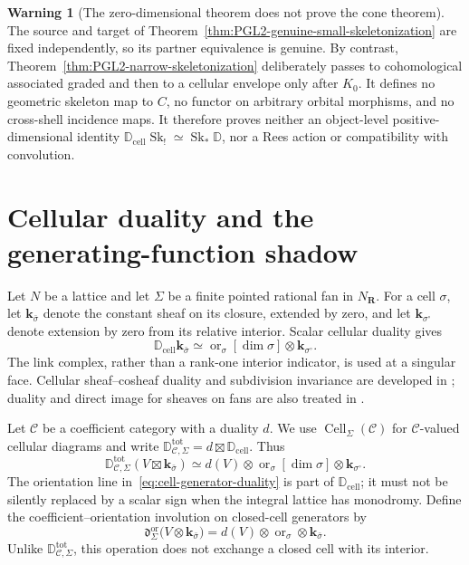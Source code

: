 \documentclass[11pt]{article}
\theoremstyle{definition}
\newtheorem{warning}[theorem]{Warning}
\theoremstyle{remark}
\newcommand{\cC}{\mathcal C}
\newcommand{\D}{\mathbb D}
\newcommand{\Dcell}{\mathbb D_{\mathrm{cell}}}
\newcommand{\Cell}{\operatorname{Cell}}
\newcommand{\Sk}{\operatorname{Sk}}
\begin{document}
\begin{warning}[The zero-dimensional theorem does not prove the cone theorem]
The source and target of
Theorem~\ref{thm:PGL2-genuine-small-skeletonization} are fixed independently,
so its partner equivalence is genuine.  By contrast,
Theorem~\ref{thm:PGL2-narrow-skeletonization} deliberately passes to
cohomological associated graded and then to a cellular envelope only after
$K_0$.  It defines no geometric skeleton map to $C$, no functor on arbitrary
orbital morphisms, and no cross-shell incidence maps.  It therefore proves
neither an object-level positive-dimensional identity
$\Dcell\Sk_!\simeq\Sk_*\D$, nor a Rees action or compatibility with
convolution.
\end{warning}



\appendix
\section{Cellular duality and the generating-function shadow}

Let $N$ be a lattice and let $\Sigma$ be a finite pointed rational fan in
$N_\mathbf R$.  For a cell $\sigma$, let $\mathbf k_{\bar\sigma}$ denote the
constant sheaf on its closure, extended by zero, and let
$\mathbf k_{\sigma^\circ}$ denote extension by zero from its relative
interior.  Scalar cellular duality gives
\begin{equation}
 \Dcell\mathbf k_{\bar\sigma}
 \simeq
 \operatorname{or}_\sigma[\dim\sigma]
 \otimes\mathbf k_{\sigma^\circ}.
 \label{eq:cell-generator-duality}
\end{equation}
The link complex, rather than a rank-one interior indicator, is used at a
singular face.  Cellular sheaf--cosheaf duality and subdivision invariance are
developed in \cite{Curry}; duality and direct image for sheaves on fans are
also treated in \cite{BresslerLunts}.

Let $\cC$ be a coefficient category with a duality $d$.  We use
$\Cell_\Sigma(\cC)$ for $\cC$-valued cellular diagrams and write
$\D^{\mathrm{tot}}_{\cC,\Sigma}=d\boxtimes\Dcell$.  Thus
\[
 \D^{\mathrm{tot}}_{\cC,\Sigma}
 (V\boxtimes\mathbf k_{\bar\sigma})
 \simeq
 d(V)\otimes\operatorname{or}_\sigma[\dim\sigma]
 \otimes\mathbf k_{\sigma^\circ}.
\]
The orientation line in~\eqref{eq:cell-generator-duality} is part of
$\Dcell$; it must not be
silently replaced by a scalar sign when the integral lattice has monodromy.
Define the coefficient--orientation involution on closed-cell generators by
\begin{equation}
 \mathfrak d^{\operatorname{or}}_\Sigma
 \bigl(V\otimes\mathbf k_{\bar\sigma}\bigr)
 =d(V)\otimes\operatorname{or}_\sigma
  \otimes\mathbf k_{\bar\sigma}.
 \label{eq:coefficient-orientation-duality}
\end{equation}
Unlike $\D^{\mathrm{tot}}_{\cC,\Sigma}$, this operation does not exchange a closed cell with
its interior.
\end{document}
